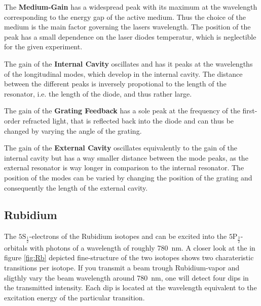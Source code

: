             \FloatBarrier

            The \textbf{Medium-Gain} has a widespread peak with its maximum at the wavelength corresponding to the energy gap of the active medium. Thus the choice of the medium is the main factor governing
            the lasers wavelength. The position of the peak has a small dependence on the laser diodes temperatur, which is neglectible for the given experiment.\newline 

            The gain of the \textbf{Internal Cavity} oscillates and has it peaks at the wavelengths of the longitudinal modes, which develop in the internal cavity. The distance between the different peaks is 
            inversely propotional to the length of the resonator, i.e. the length of the diode, and thus rather large.\newline

            The gain of the \textbf{Grating Feedback} has a sole peak at the frequency of the first-order refracted light, that is reflected back into the diode and can thus be changed by varying the angle of 
            the grating.\newline
            
            The gain of the \textbf{External Cavity} oscillates equivalently to the gain of the internal cavity but has a way smaller distance between the mode peaks, as the external resonator is way longer in
            comparison to the internal resonator. The position of the modes can be varied by changing the position of the grating and consequently the length of the external cavity. 
    
    

    \subsection{Rubidium}
        The $\text{5S}_{\frac{1}{2}}$-electrons of the Rubidium isotopes  and  can be excited into the $\text{5P}_{\frac{3}{2}}$-orbitals with photons of a wavelength of roughly 
        \SI{780}{\nano\metre}. A closer look at the in figure \ref{fig:Rb} depicted fine-structure of the two isotopes shows two charateristic transitions per isotope. If you transmit a beam trough Rubidium-vapor
        and sligthly vary the beam wavelength around \SI{780}{\nano\metre}, one will detect four dips in the transmitted intensity. Each dip is located at the wavelength equivalent to the 
        excitation energy of the particular transition.  
        

